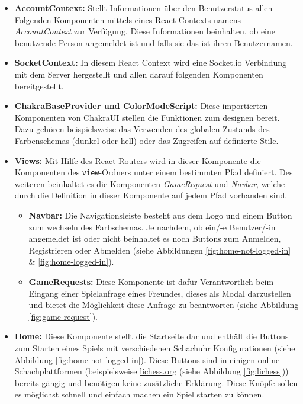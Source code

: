\begin{itemize}
\item \textbf{AccountContext:} Stellt Informationen über den Benutzerstatus allen Folgenden Komponenten mittels eines React-Contexts namens \textit{AccountContext} zur Verfügung. Diese Informationen beinhalten, ob eine benutzende Person angemeldet ist und falls sie das ist ihren Benutzernamen.
\item \textbf{SocketContext:} In diesem React Context wird eine Socket.io Verbindung mit dem Server hergestellt und allen darauf folgenden Komponenten bereitgestellt.
\item \textbf{ChakraBaseProvider und ColorModeScript:} Diese importierten Komponenten von ChakraUI stellen die Funktionen zum designen bereit. Dazu gehören beispielsweise das Verwenden des globalen Zustands des Farbenschemas (dunkel oder hell) oder das Zugreifen auf definierte Stile.
\item \textbf{Views:} Mit Hilfe des React-Routers wird in dieser Komponente die Komponenten des \verb|view|-Ordners unter einem bestimmten Pfad definiert. Des weiteren beinhaltet es die Komponenten \textit{GameRequest} und \textit{Navbar}, welche durch die Definition in dieser Komponente auf jedem Pfad vorhanden sind.
\begin{itemize}
\item \textbf{Navbar:} Die Navigationsleiste besteht aus dem Logo und einem Button zum wechseln des Farbschemas. Je nachdem, ob ein/-e Benutzer/-in angemeldet ist oder nicht beinhaltet es noch Buttons zum Anmelden, Registrieren oder Abmelden (siehe Abbildungen \ref{fig:home-not-logged-in} \& \ref{fig:home-logged-in}).
\item \textbf{GameRequests:} Diese Komponente ist dafür Verantwortlich beim Eingang einer Spielanfrage eines Freundes, dieses als Modal darzustellen und bietet die Möglichkeit diese Anfrage zu beantworten (siehe Abbildung \ref{fig:game-request}).
\end{itemize}
\item \textbf{Home:} Diese Komponente stellt die Startseite dar und enthält die Buttons zum Starten eines Spiels mit verschiedenen Schachuhr Konfigurationen (siehe Abbildung \ref{fig:home-not-logged-in}). Diese Buttons sind in einigen online Schachplattformen (beispielsweise \url{lichess.org} (siehe Abbildung \ref{fig:lichess})) bereits gängig und benötigen keine zusätzliche Erklärung. Diese Knöpfe sollen es möglichst schnell und einfach machen ein Spiel starten zu können.


\end{itemize}
